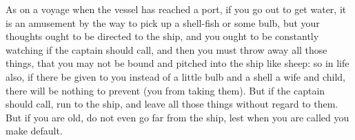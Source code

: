 As on a voyage when the vessel has reached  a port, if you go out to get water,
it is an  amusement by the way to  pick up a shell-fish or some  bulb, but your
thoughts ought  to be  directed to  the ship,  and you  ought to  be constantly
watching if  the captain should  call, and then you  must throw away  all those
things, that you may  not be bound and pitched into the ship  like sheep: so in
life also, if there be given to you instead of a little bulb and a shell a wife
and child, there will be nothing to  prevent (you from taking them). But if the
captain should call, run to the ship, and leave all those things without regard
to them. But  if you are old, do not  even go far from the ship,  lest when you
are called you make default.
